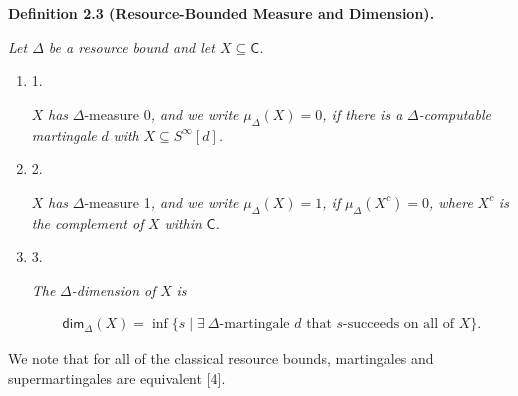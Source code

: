\documentclass[10pt,a4paper]{article}
\begin{document}


\par\medskip\noindent\textbf{
\textbf{Definition 2.3}\textbf{ }(Resource-Bounded Measure and Dimension)\textbf{.}
}\par



\emph{Let $\Delta$ be a resource bound and let $X\subseteq\mathsf{C}$.}\par


\begin{enumerate}


\item[] 
1. 


$X$\emph{ has }$\Delta$-measure 0\emph{, and we write }$\mu_{\Delta}(X)=0$\emph{, if there is a }$\Delta$\emph{-computable martingale }$d$\emph{ with }$X\subseteq S^{\infty}[d]$\emph{.}\par





\item[] 
2. 


$X$\emph{ has }$\Delta$-measure 1\emph{, and we write }$\mu_{\Delta}(X)=1$\emph{, if }$\mu_{\Delta}(X^{c})=0$\emph{, where }$X^{c}$\emph{ is the complement of }$X$\emph{ within }$\mathsf{C}$\emph{.}\par





\item[] 
3. 


\emph{The }$\Delta$\emph{-dimension of }$X$\emph{ is}\par


\[\begin{gathered}
{\mathsf{dim}}_{\Delta}(X)=\inf\{s\mid\exists\ \Delta\textrm{-martingale $d$ that $s$-succeeds on all of $X$}\}.
\end{gathered}\]





\end{enumerate}






We note that for all of the classical resource bounds, martingales and supermartingales are equivalent [4].\par
\end{document}
